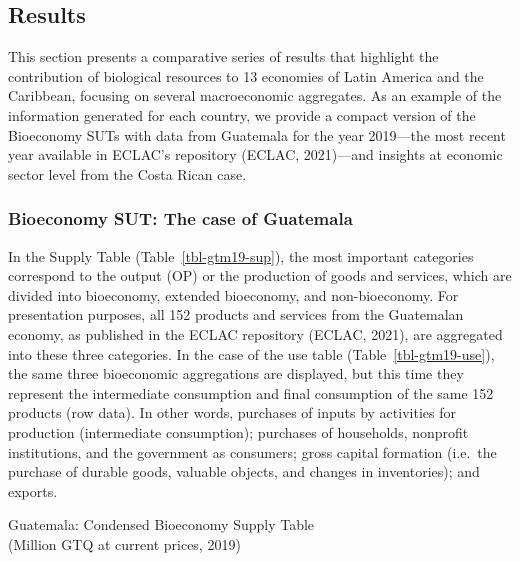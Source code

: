 \documentclass[
  letterpaper,
  DIV=11,
  numbers=noendperiod]{scrartcl}
\begin{document}
\subsection{Results}\label{results}

This section presents a comparative series of results that highlight the
contribution of biological resources to 13 economies of Latin America
and the Caribbean, focusing on several macroeconomic aggregates. As an
example of the information generated for each country, we provide a
compact version of the Bioeconomy SUTs with data from Guatemala for the
year 2019---the most recent year available in ECLAC's repository (ECLAC,
2021)---and insights at economic sector level from the Costa Rican case.

\subsubsection{Bioeconomy SUT: The case of
Guatemala}\label{bioeconomy-sut-the-case-of-guatemala}

In the Supply Table (Table~\ref{tbl-gtm19-sup}), the most important
categories correspond to the output (OP) or the production of goods and
services, which are divided into bioeconomy, extended bioeconomy, and
non-bioeconomy. For presentation purposes, all 152 products and services
from the Guatemalan economy, as published in the ECLAC repository
(ECLAC, 2021), are aggregated into these three categories. In the case
of the use table (Table~\ref{tbl-gtm19-use}), the same three bioeconomic
aggregations are displayed, but this time they represent the
intermediate consumption and final consumption of the same 152 products
(row data). In other words, purchases of inputs by activities for
production (intermediate consumption); purchases of households,
nonprofit institutions, and the government as consumers; gross capital
formation (i.e.~the purchase of durable goods, valuable objects, and
changes in inventories); and exports.

\begin{table}

\caption{\label{tbl-gtm19-sup}Guatemala: Condensed Bioeconomy Supply
Table\\
(Million GTQ at current prices, 2019)}


\end{table}%
\end{document}
